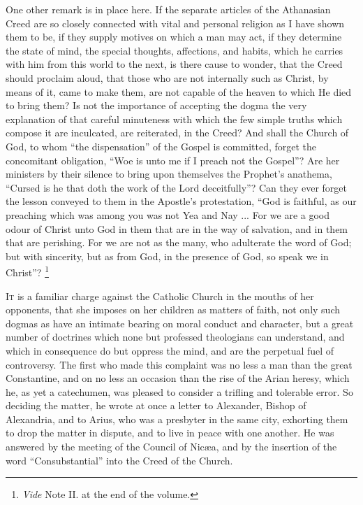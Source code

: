One other remark is in place here. If the separate articles of the
Athanasian Creed are so closely connected with vital and personal
religion as I have shown them to be, if they supply motives on which a
man may act, if they determine the state of mind, the special
thoughts, affections, and habits, which he carries with him from this
world to the next, is there cause to wonder, that the Creed should
proclaim aloud, that those who are not internally such as
Christ, by means of it, came to make them, are not capable of the
heaven to which He died to bring them? Is not the importance of
accepting the dogma the very explanation of that careful minuteness
with which the few simple truths which compose it are inculcated, are
reiterated, in the Creed? And shall the Church of God, to whom
``the dispensation'' of the Gospel is committed, forget the
concomitant obligation, ``Woe is unto me if I preach not the
Gospel''? Are her ministers by their silence to bring upon
themselves the Prophet's anathema, ``Cursed is he that doth the
work of the Lord deceitfully''? Can they ever forget the lesson
conveyed to them in the Apostle's protestation, ``God is faithful,
as our preaching which was among you was not Yea and Nay ... For we
are a good odour of Christ unto God in them that are in the way of
salvation, and in them that are perishing. For we are not as the many,
who adulterate the word of God; but with sincerity, but as from God,
in the presence of God, so speak we in Christ''? \footnote{\emph{Vide} Note II. at the end of the volume.}


I\textsc{t} is a familiar charge against the Catholic Church in the mouths
of her opponents, that she imposes on her children as matters of
faith, not only such dogmas as have an intimate bearing on moral
conduct and character, but a great number of doctrines which none but
professed theologians can understand, and which in consequence do but
oppress the mind, and are the perpetual fuel of controversy. The first
who made this complaint was no less a man than the great Constantine,
and on no less an occasion than the rise of the Arian heresy, which
he, as yet a catechumen, was pleased to consider a trifling and
tolerable error. So deciding the matter, he wrote at once a letter to
Alexander, Bishop of Alexandria, and to Arius, who was a presbyter in
the same city, exhorting them to drop the matter in dispute, and to
live in peace with one another. He was answered by the meeting of the
Council of Nicæa, and by the insertion of the word
``Consubstantial'' into the Creed of the Church.


